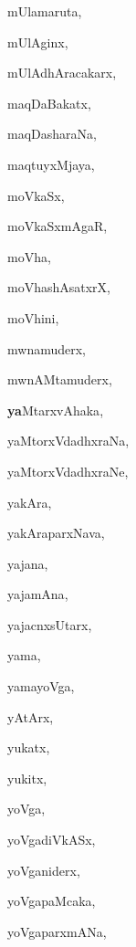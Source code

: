 \begin{multicols}{3}
{\noindent
{mUlamaruta}, \pageref{mUlamaruta}

\noindent
{mUlAginx}, \pageref{mUlAginx}

\noindent
{mUlAdhAracakarx}, \pageref{mUlAdhAracakarx}

\noindent
{maqDaBakatx}, \pageref{maqDaBakatx}

\noindent
{maqDasharaNa}, \pageref{maqDasharaNa}

\noindent
{maqtuyxMjaya}, \pageref{maqtuyxMjaya}

\noindent
{moVkaSx}, \pageref{moVkaSx}

\noindent
{moVkaSxmAgaR}, \pageref{moVkaSxmAgaR}

\noindent
{moVha}, \pageref{moVha}

\noindent
{moVhashAsatxrX}, \pageref{moVhashAsatxrX}

\noindent
{moVhini}, \pageref{moVhini}

\noindent
{mwnamuderx}, \pageref{mwnamuderx}

\noindent
{mwnAMtamuderx}, \pageref{mwnAMtamuderx}

\noindent
{{\large\textbf{ya}}MtarxvAhaka}, \pageref{yaMtarxvAhaka}

\noindent
{yaMtorxVdadhxraNa}, \pageref{yaMtorxVdadhxraNa}

\noindent
{yaMtorxVdadhxraNe}, \pageref{yaMtorxVdadhxraNe}

\noindent
{yakAra}, \pageref{yakAra}

\noindent
{yakAraparxNava}, \pageref{yakAraparxNava}

\noindent
{yajana}, \pageref{yajana}

\noindent
{yajamAna}, \pageref{yajamAna}

\noindent
{yajacnxsUtarx}, \pageref{yajacnxsUtarx}

\noindent
{yama}, \pageref{yama}

\noindent
{yamayoVga}, \pageref{yamayoVga}

\noindent
{yAtArx}, \pageref{yAtArx}

\noindent
{yukatx}, \pageref{yukatx}

\noindent
{yukitx}, \pageref{yukitx}

\noindent
{yoVga}, \pageref{yoVga}

\noindent
{yoVgadiVkASx}, \pageref{yoVgadiVkASx}

\noindent
{yoVganiderx}, \pageref{yoVganiderx}

\noindent
{yoVgapaMcaka}, \pageref{yoVgapaMcaka}

\noindent
{yoVgaparxmANa}, \pageref{yoVgaparxmANa}

}
\end{multicols}
